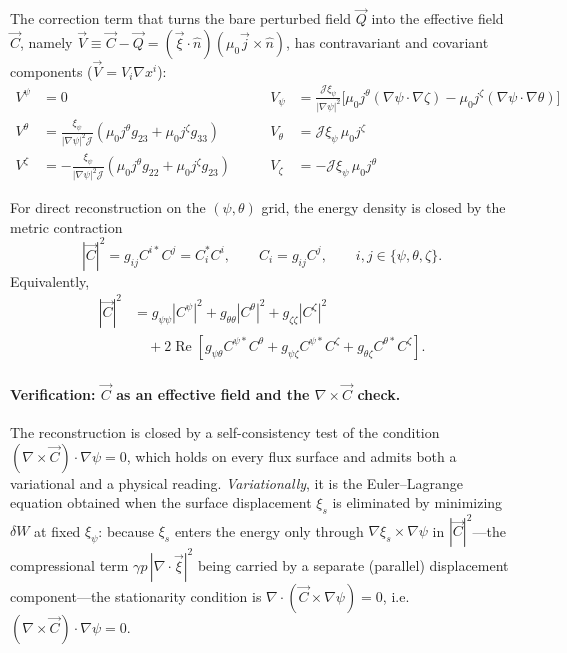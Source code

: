 \documentclass[10pt,a4paper]{article}
\numberwithin{equation}{section}
\begin{document}
The correction term that turns the bare perturbed field $\vec Q$ into the effective field
$\vec C$, namely $\vec V\equiv\vec C-\vec Q=(\vec\xi\cdot\hat n)(\mu_0\vec j\times\hat n)$, has
contravariant and covariant components ($\vec V=V_i\nabla x^i$): 
\begin{equation}
\begin{aligned}
V^\psi   &= 0
&\qquad
V_\psi &= \frac{\mathcal{J}\xi_\psi}{|\nabla\psi|^2}
\bigl[ \mu_0 j^\theta (\nabla\psi\cdot\nabla\zeta)
- \mu_0 j^\zeta (\nabla\psi\cdot\nabla\theta) \bigr] \\
V^\theta &= \frac{\xi_\psi}{|\nabla\psi|^2 \mathcal{J}}
(\mu_0j^\theta g_{23} + \mu_0j^\zeta g_{33})
&\qquad
V_\theta &= \mathcal{J}\xi_\psi\,\mu_0 j^\zeta \\
V^\zeta  &= -\frac{\xi_\psi}{|\nabla\psi|^2 \mathcal{J}}
(\mu_0j^\theta g_{22} + \mu_0j^\zeta g_{23})
&\qquad
V_\zeta &= -\mathcal{J}\xi_\psi\,\mu_0 j^\theta
\end{aligned}
\label{eq:Vcomp}
\end{equation}

For direct reconstruction on the $(\psi,\theta)$ grid, the energy density is closed by the metric contraction
\begin{equation}
|\vec C|^2
=
g_{ij}C^{i*}C^j
=
C_i^*C^i,
\qquad
C_i=g_{ij}C^j,
\qquad
i,j\in\{\psi,\theta,\zeta\}.
\end{equation}
Equivalently,
\begin{equation}
\begin{aligned}
|\vec C|^2
&=
g_{\psi\psi}|C^\psi|^2
+g_{\theta\theta}|C^\theta|^2
+g_{\zeta\zeta}|C^\zeta|^2 \\
&\quad
+2\operatorname{Re}\!\left[
g_{\psi\theta}C^{\psi*}C^\theta
+g_{\psi\zeta}C^{\psi*}C^\zeta
+g_{\theta\zeta}C^{\theta*}C^\zeta
\right].
\end{aligned}
\end{equation}

\paragraph{Verification: $\vec C$ as an effective field and the $\nabla\times\vec C$ check.}
\label{par:cveri}
The reconstruction is closed by a self-consistency test of the condition
$(\nabla\times\vec C)\cdot\nabla\psi=0$, which holds on every flux surface and admits both a
variational and a physical reading. \emph{Variationally}, it is the Euler--Lagrange
equation obtained when the surface displacement $\xi_s$ is eliminated by minimizing
$\delta W$ at fixed $\xi_\psi$: because $\xi_s$ enters the energy only through
$\nabla\xi_s\times\nabla\psi$ in $|\vec C|^2$---the compressional term
$\gamma p\,|\nabla\cdot\vec\xi|^2$ being carried by a separate (parallel) displacement
component---the stationarity condition is $\nabla\cdot(\vec C\times\nabla\psi)=0$, i.e.\
$(\nabla\times\vec C)\cdot\nabla\psi=0$.
\end{document}

